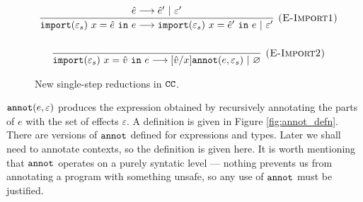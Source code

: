 \begin{figure}


\[
\begin{array}{c}
\infer[\textsc{(E-Import1)}]
	{\kwa{import}(\varepsilon_s)~x = \hat e~\kw{in} e \longrightarrow \kwa{import}(\varepsilon_s)~x = \hat e'~\kw{in} e~|~\varepsilon'}
	{\hat e \longrightarrow \hat e'~|~\varepsilon'}\\[4ex]

\infer[\textsc{(E-Import2)}]
	{\kwa{import}(\varepsilon_s)~x = \hat v~\kw{in} e \longrightarrow [\hat v/x]\kwa{annot}(e, \varepsilon_s)~|~\varnothing}
	{}

\end{array}
\]
\caption{New single-step reductions in $\mathtt{CC}$.}
\label{fig:epscalc_reductions}
\end{figure}

$\mathtt{annot}(e, \varepsilon)$ produces the expression obtained by
recursively annotating the parts of $e$ with the set of effects
$\varepsilon$. A definition is given in Figure
\ref{fig:annot_defn}. There are versions of $\mathtt{annot}$ defined for
expressions and types. Later we shall need to annotate contexts, so
the definition is given here. It is worth mentioning that
$\mathtt{annot}$ operates on a purely syntatic level --- nothing prevents
us from annotating a program with something unsafe, so any use of
$\mathtt{annot}$ must be justified.

